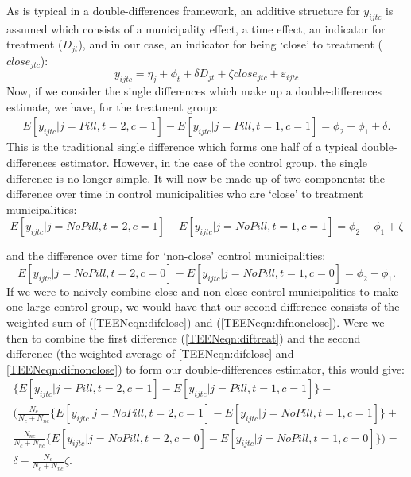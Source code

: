 As is typical in a double-differences framework, an additive structure for 
$y_{ijtc}$ is assumed which consists of a municipality effect, a time effect,
an indicator for treatment ($D_{jt}$), and in our case, an indicator for being 
`close' to treatment ($close_{jtc}$):
\begin{equation}
 \label{TEENeqn:DDa1}
 y_{ijtc} = \eta_j + \phi_t + \delta D_{jt} + \zeta close_{jtc} + 
\varepsilon_{ijtc}
\end{equation}
Now, if we consider the single differences which make up a double-differences 
estimate, we have, for the treatment group:
\begin{eqnarray}
\label{TEENeqn:diftreat}
 E[y_{ijtc}|j=Pill,t=2,c=1]- E[y_{ijtc}|j=Pill,t=1,c=1] = \phi_2-\phi_1+\delta.
\end{eqnarray}
This is the traditional single difference which forms one half of a typical
double-differences estimator.  However, in the case of the control group, the
single difference is no longer simple.  It will now be made up of two components:
the difference over time in control municipalities who are `close' to treatment 
municipalities:
\renewcommand{\theequation}{\arabic{equation}a}
\begin{equation}
\label{TEENeqn:difclose}
 E[y_{ijtc}|j=No Pill,t=2,c=1]- E[y_{ijtc}|j=No Pill,t=1,c=1] = \phi_2-\phi_1+\zeta
\end{equation}
\addtocounter{equation}{-1}
\renewcommand{\theequation}{\arabic{equation}b}
and the difference over time for `non-close' control municipalities:
\begin{equation}
\label{TEENeqn:difnonclose}
 E[y_{ijtc}|j=No Pill,t=2,c=0]- E[y_{ijtc}|j=No Pill,t=1,c=0] = \phi_2-\phi_1.
\end{equation}
\renewcommand{\theequation}{\arabic{equation}}
If we were to naively combine close and non-close control municipalities to make
one large control group, we would have that our second difference consists of the
weighted sum of (\ref{TEENeqn:difclose}) and (\ref{TEENeqn:difnonclose}).  Were
we then to combine the first difference (\ref{TEENeqn:diftreat}) and the second
difference (the weighted average of \ref{TEENeqn:difclose} and 
\ref{TEENeqn:difnonclose}) to form our double-differences estimator, this would 
give:
\begin{equation}
\begin{split}
 \{E[y_{ijtc}|j=Pill,t=2,c=1]- E[y_{ijtc}|j=Pill,t=1,c=1]\}-\\
 \bigg(\frac{N_c}{N_c+N_{nc}}\{E[y_{ijtc}|j=No Pill,t=2,c=1]- E[y_{ijtc}|j=No Pill,t=1,c=1]\}+\\
 \frac{N_{nc}}{N_c+N_{nc}}\{E[y_{ijtc}|j=No Pill,t=2,c=0]- E[y_{ijtc}|j=No Pill,t=1,c=0]\}\bigg) = \\
 \delta - \frac{N_{c}}{N_{c}+N_{nc}}\zeta.
 \end{split}
\end{equation}
